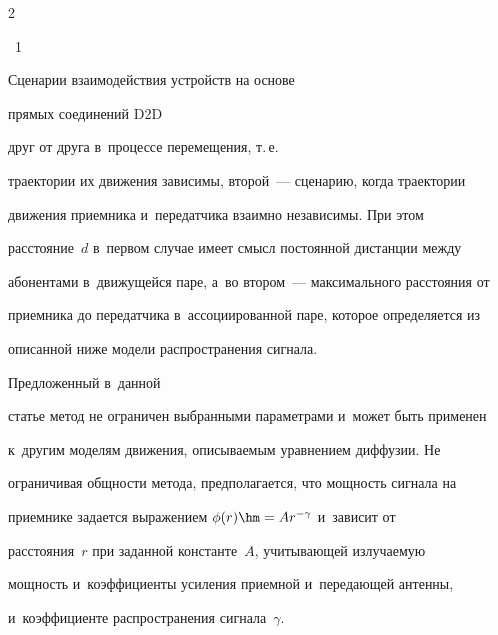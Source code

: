 \begin{multicols}{2}
{\begin{center}
\end{center}








\noindent


{{\figurename~1}\ \ \small{Сценарии взаимодействия устройств на основе 


прямых соединений D2D}}


}










\addtocounter{figure}{1}








\noindent


 друг от друга в~процессе перемещения, т.\,е.\ 


траектории их движения зависимы, второй~--- сценарию, когда траектории 


движения приемника и~передатчика взаимно независимы. При этом 


расстояние~$d$ в~первом случае имеет смысл постоянной дистанции между 


абонентами в~движущейся паре, а~во втором~--- максимального расстояния от 


приемника до передатчика в~ассоциированной паре, которое определяется из 


описанной ниже модели распространения сигнала. 





Предложенный в~данной 


статье метод не ограничен выбранными параметрами и~может быть применен 


к~другим моделям движения, описываемым уравнением диффузии. Не 


ограничивая общности метода, предполагается, что мощность сигнала на 


приемнике задается выражением $\phi(r)\hm=Ar^{-\gamma}$ и~зависит от 


расстояния~$r$ при заданной константе~$A$, учитывающей излучаемую 


мощность и~коэффициенты усиления приемной и~передающей антенны, 


и~коэффициенте распространения сигнала~$\gamma$. 



\end{multicols}
